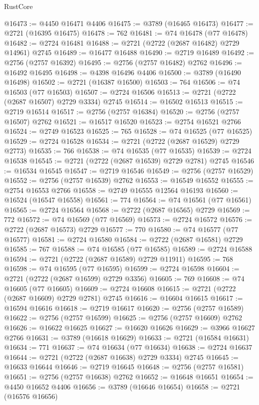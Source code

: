\begin{lexlean}{RustCore}
\begin{coremodule}
@16473 := @4450 @16471 @4406
@16475 := @3789 (@16465 @16473)
@16477 := @2721 (@16395 @16475)
@16478 := 762
@16481 := @74 @16478 (@77 @16478)
@16482 := @2724 @16481
@16488 := @2721 (@2722 (@2687 @16482) @2729 @14961) @2745
@16489 := @16477 @16488
@16490 := @2719 @16489
@16492 := @2756 (@2757 @16392)
@16495 := @2756 (@2757 @16482) @2762
@16496 := @16492 @16495
@16498 := @4398 @16496 @4406
@16500 := @3789 (@16490 @16498)
@16502 := @2721 (@16387 @16500)
@16503 := 764
@16506 := @74 @16503 (@77 @16503)
@16507 := @2724 @16506
@16513 := @2721 (@2722 (@2687 @16507) @2729 @3334) @2745
@16514 := @16502 @16513
@16515 := @2719 @16514
@16517 := @2756 (@2757 @16384)
@16520 := @2756 (@2757 @16507) @2762
@16521 := @16517 @16520
@16523 := @2754 @16521 @2766
@16524 := @2749 @16523
@16525 := 765
@16528 := @74 @16525 (@77 @16525)
@16529 := @2724 @16528
@16534 := @2721 (@2722 (@2687 @16529) @2729 @2773)
@16535 := 766
@16538 := @74 @16535 (@77 @16535)
@16539 := @2724 @16538
@16545 := @2721 (@2722 (@2687 @16539) @2729 @2781) @2745
@16546 := @16534 @16545
@16547 := @2719 @16546
@16549 := @2756 (@2757 @16529)
@16552 := @2756 (@2757 @16539) @2762
@16553 := @16549 @16552
@16555 := @2754 @16553 @2766
@16558 := @2749 @16555 @12564 @16193
@16560 := @16524 (@16547 @16558)
@16561 := 774
@16564 := @74 @16561 (@77 @16561)
@16565 := @2724 @16564
@16568 := @2722 (@2687 @16565) @2729
@16569 := 772
@16572 := @74 @16569 (@77 @16569)
@16573 := @2724 @16572
@16576 := @2722 (@2687 @16573) @2729
@16577 := 770
@16580 := @74 @16577 (@77 @16577)
@16581 := @2724 @16580
@16584 := @2722 (@2687 @16581) @2729
@16585 := 767
@16588 := @74 @16585 (@77 @16585)
@16589 := @2724 @16588
@16594 := @2721 (@2722 (@2687 @16589) @2729 @11911)
@16595 := 768
@16598 := @74 @16595 (@77 @16595)
@16599 := @2724 @16598
@16604 := @2721 (@2722 (@2687 @16599) @2729 @3356)
@16605 := 769
@16608 := @74 @16605 (@77 @16605)
@16609 := @2724 @16608
@16615 := @2721 (@2722 (@2687 @16609) @2729 @2781) @2745
@16616 := @16604 @16615
@16617 := @16594 @16616
@16618 := @2719 @16617
@16620 := @2756 (@2757 @16589)
@16622 := @2756 (@2757 @16599)
@16625 := @2756 (@2757 @16609) @2762
@16626 := @16622 @16625
@16627 := @16620 @16626
@16629 := @3966 @16627 @2766
@16631 := @3789 (@16618 @16629)
@16633 := @2721 (@16584 @16631)
@16634 := 771
@16637 := @74 @16634 (@77 @16634)
@16638 := @2724 @16637
@16644 := @2721 (@2722 (@2687 @16638) @2729 @3334) @2745
@16645 := @16633 @16644
@16646 := @2719 @16645
@16648 := @2756 (@2757 @16581)
@16651 := @2756 (@2757 @16638) @2762
@16652 := @16648 @16651
@16654 := @4450 @16652 @4406
@16656 := @3789 (@16646 @16654)
@16658 := @2721 (@16576 @16656)

\end{coremodule}
\end{lexlean}
